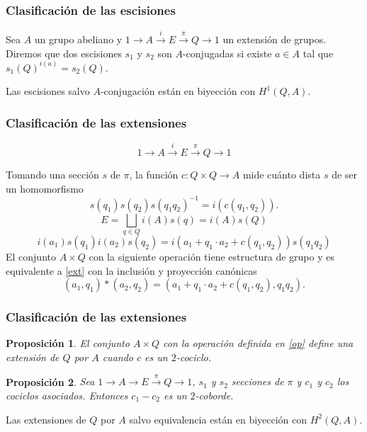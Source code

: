\documentclass[
	11pt, %
]{beamer}
\newcommand{\homo}[3]{#1\colon #2\to #3}
\newcommand{\extension}[5]{1\xrightarrow{} #3 \xrightarrow{#1} #4\xrightarrow{#2} #5 \xrightarrow{} 1}
\newtheorem{proposition}{Proposici\'on}
\begin{document}
\begin{frame}
	\frametitle{Clasificación de las escisiones}
	\begin{definition}
		Sea $A$ un grupo abeliano y $\extension i \pi A E Q$ un extensión de grupos. Diremos que dos escisiones $s_1$ y $s_2$ son $A$-conjugadas si existe $a\in A$ tal que $s_1(Q)^{i(a)} = s_2(Q)$.
	\end{definition}
	
	\begin{theorem}
		Las escisiones salvo $A$-conjugación están en biyección con $H^1(Q,A)$.
	\end{theorem}
\end{frame}

\begin{frame}
	\frametitle{Clasificación de las extensiones}
	
	\begin{equation}\label{ext}
		\extension i \pi A E Q
	\end{equation}
	
	Tomando una sección $s$ de $\pi$, la función $\homo c {Q\times Q} A$ mide cuánto dista $s$ de ser un homomorfismo
	\begin{equation*}
		s(q_1)s(q_2)s(q_1q_2)^{-1} = i(c(q_1,q_2)).
	\end{equation*}
	\pause
	$$	
		E = \bigsqcup_{q\in Q} i(A)s(q) = i(A)s(Q)
	$$
	\pause
	$$
		i(a_1)s(q_1)i(a_2)s(q_2) = %
		i(a_1+q_1\cdot a_2 + c(q_1,q_2))s(q_1q_2)
	$$
	\pause
	El conjunto $A\times Q$ con la siguiente operación tiene estructura de grupo y es equivalente a \eqref{ext} con la inclusión y proyección canónicas
	\begin{equation}\label{op}
		(a_1,q_1)*(a_2,q_2) = (a_1+q_1\cdot a_2 + c(q_1,q_2),q_1q_2). 
	\end{equation}
\end{frame}

\begin{frame}
	\frametitle{Clasificación de las extensiones}
	\begin{proposition}
		El conjunto $A\times Q$ con la operación definida en \eqref{op} define una extensión de $Q$ por $A$ cuando $c$ es un $2$-cociclo.
	\end{proposition}
	
	\begin{proposition}
		Sea $\extension {}{\pi} A E Q$, $s_1$ y $s_2$ secciones de $\pi$ y $c_1$ y $c_2$ los cociclos asociados. Entonces $c_1-c_2$ es un $2$-coborde. 
	\end{proposition}
	
	\begin{theorem}
		Las extensiones de $Q$ por $A$ salvo equivalencia están en biyección con $H^2(Q,A)$.
	\end{theorem}	
\end{frame}
\end{document}
